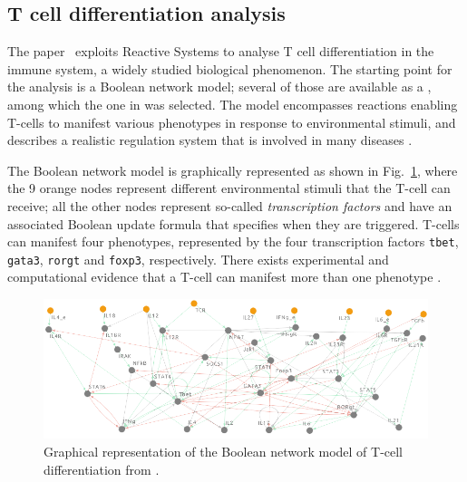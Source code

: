 

\subsection{T cell differentiation analysis}\label{sec:datamod2023}

The paper~\cite{datamod2023} exploits Reactive Systems to analyse T cell differentiation in the immune system, a widely studied biological phenomenon. The starting point for the analysis is a Boolean network model; several of those are available as a \cite{saez2007logical,thakar2010boolean,puniya2018mechanistic}, among which the one in \cite{puniya2018mechanistic} was selected. The model encompasses reactions enabling T-cells to manifest various phenotypes in response to environmental stimuli, and describes a realistic regulation system that is involved in many diseases \cite{lafaille1998role,hirahara2016cd4+,meng2016regulatory}.

The Boolean network model is graphically represented as shown in Fig.~\ref{fig:model-graph}, where the 9 orange nodes represent different environmental stimuli that the T-cell can receive; all the other nodes represent so-called \emph{transcription factors} and have an associated Boolean update formula that specifies when they are triggered. 
T-cells can manifest four phenotypes, 
represented by the four transcription factors \texttt{tbet}, \texttt{gata3}, \texttt{rorgt} and \texttt{foxp3}, respectively.
There exists experimental and computational evidence that a T-cell can manifest more than one phenotype \cite{luckheeram2012cd4+,puniya2018mechanistic}.

\begin{figure}[t]
	\begin{center}
		\includegraphics[width=\columnwidth]{figs-datamod2023/Tcell-graph-8set23.png}
	\end{center}
	\caption{Graphical representation of the Boolean network model of T-cell differentiation from \cite{puniya2018mechanistic}.}
	\label{fig:model-graph}
\end{figure}

